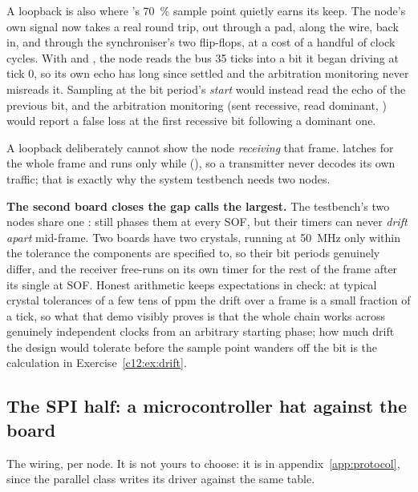 A loopback is also where 's 70~\% sample point quietly earns its keep. The
node's own signal now takes a real round trip, out through a pad, along the wire, back in, and through
the  synchroniser's two flip-flops, at a cost of a handful of clock cycles. With
 and , the node reads the bus 35 ticks into a bit it
began driving at tick 0, so its own echo has long since settled and the arbitration monitoring never
misreads it. Sampling at the bit period's \emph{start} would instead read the echo of the previous
bit, and the arbitration monitoring (sent recessive, read dominant, ) would report a
false loss at the first recessive bit following a dominant one.

A loopback deliberately cannot show the node \emph{receiving} that frame. 
latches  for the whole frame and  runs only while
 (), so a transmitter never decodes its own traffic; that is exactly
why the system testbench needs two nodes.

\textbf{The second board closes the gap  calls the largest.} The testbench's
two nodes share one :  still phases them at every SOF, but their timers can
never \emph{drift apart} mid-frame. Two boards have two crystals, running at 50~MHz only within the
tolerance the components are specified to, so their bit periods genuinely differ, and the receiver
free-runs on its own timer for the rest of the frame after its single  at SOF. Honest
arithmetic keeps expectations in check: at typical crystal tolerances of a few tens of ppm the drift
over a frame is a small fraction of a tick, so what that demo visibly proves is that the whole chain
works across genuinely independent clocks from an arbitrary starting phase; how much drift the design
would tolerate before the sample point wanders off the bit is the calculation in
Exercise~\ref{c12:ex:drift}.

\subsection*{The SPI half: a microcontroller hat against the board}
The wiring, per node. It is not yours to choose: it is in appendix~\ref{app:protocol}, since the
parallel class writes its driver against the same table.

